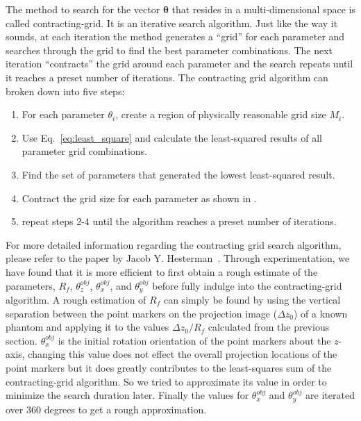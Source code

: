 The method to search for the vector $\boldsymbol{\theta}$ that resides in a multi-dimensional space is called contracting-grid.  It is an iterative search algorithm.  Just like the way it sounds, at each iteration the method generates a ``grid'' for each parameter and searches through the grid to find the best parameter combinations.  The next iteration ``contracts'' the grid around each parameter and the search repeats until it reaches a preset number of iterations.
The contracting grid algorithm can broken down into five steps:
\begin{enumerate}
\item For each parameter $\theta_i$, create a region of physically reasonable grid size $M_i$.
\item Use Eq.~\ref{eq:least_square} and calculate the least-squared results of all parameter grid combinations.
\item Find the set of parameters that generated the lowest least-squared result.
\item Contract the grid size for each parameter as shown in .
\item repeat steps 2-4 until the algorithm reaches a preset number of iterations.
\end{enumerate}

For more detailed information regarding the contracting grid search algorithm, please refer to the paper by Jacob Y. Hesterman~\citep{Hesterman2010}.  Through experimentation, we have found that it is more efficient to first obtain a rough estimate of the parameters, $R_f$, $\theta^{obj}_z$, $\theta^{obj}_x$, and $\theta^{obj}_y$ before fully indulge into the contracting-grid algorithm.  A rough estimation of $R_f$ can simply be found by using the vertical separation between the point markers on the projection image ($\Delta z_0$) of a known phantom and applying it to the values $\Delta z_0/R_f$ calculated from the previous section.  $\theta^{obj}_x$ is the initial rotation orientation of the point markers about the $z$-axis, changing this value does not effect the overall projection locations of the point markers but it does greatly contributes to the least-squares sum of the contracting-grid algorithm.  So we tried to approximate its value in order to minimize the search duration later.  Finally the values for $\theta_x^{obj}$ and $\theta_y^{obj}$ are iterated over 360 degrees to get a rough approximation.  

